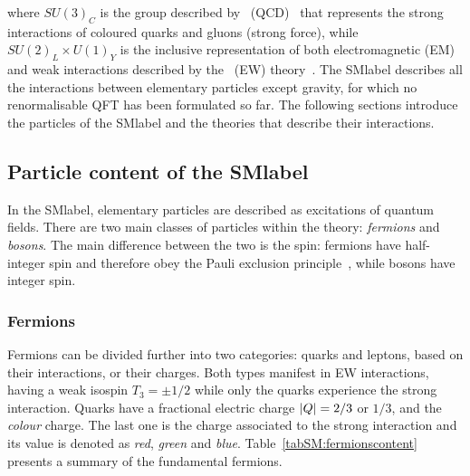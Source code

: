 where $SU(3)_C$ is the group described by ~(\acrshort{QCD})~\cite{QCD} that
represents the strong interactions of coloured quarks and gluons (strong force),
while $SU(2)_L\times U(1)_Y$ is the inclusive representation of both electromagnetic (EM) and weak interactions
described by the ~(\acrshort{EW}) theory~\cite{PhysRevLett.19.1264,Salam:1968rm,GLASHOW1961579}. The \acrshort{SMlabel} describes all the interactions between elementary
particles except gravity, for which no renormalisable \acrshort{QFT} has been formulated so far.
The following sections introduce the particles of the \acrshort{SMlabel} and the theories that describe their interactions.  

\subsection{Particle content of the \acrlong{SMlabel}}

In the \acrshort{SMlabel}, elementary particles are described as excitations of quantum fields.
There are two main classes of particles within the theory: \textit{fermions} and \textit{bosons}.
The main difference between the two is the spin: fermions have half-integer spin and therefore obey the Pauli exclusion
principle~\cite{Pauli1925}, while bosons have integer spin.

\subsubsection{Fermions}

Fermions can be divided further into two categories: quarks and leptons, based on their interactions, or their charges.
Both types manifest in \acrshort{EW} interactions, having a weak isospin $T_3=\pm1/2$ while only the quarks experience the strong interaction. Quarks have a fractional electric charge $\abs{Q}=2/3$ or $1/3$, and the \textit{colour} charge. The last one is the charge associated to the strong interaction and its value is denoted as \textit{red}, \textit{green} and \textit{blue}. Table~\ref{tabSM:fermionscontent} presents a summary of the fundamental fermions.\\

